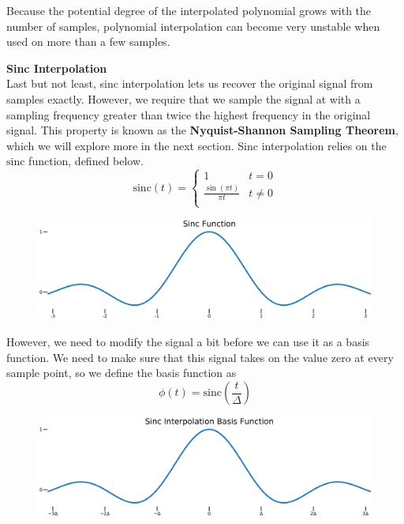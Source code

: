 Because the potential degree of the interpolated polynomial grows with the number of samples, polynomial interpolation can become very unstable when used on more than a few samples.

\textbf{Sinc Interpolation} \\
Last but not least, sinc interpolation lets us recover the original signal from samples exactly. However, we require that we sample the signal at with a sampling frequency greater than twice the highest frequency in the original signal. This property is known as the \textbf{Nyquist-Shannon Sampling Theorem}, which we will explore more in the next section.
\newline
Sinc interpolation relies on the $\mathrm{sinc}$ function, defined below.
\begin{equation*}
\mathrm{sinc}(t) = \begin{cases}
1 & t = 0 \\
\frac{\sin{} (\pi t)}{\pi t} & t \neq 0 \\
\end{cases}
\end{equation*}

\begin{figure}[H]
\centering
\includegraphics[width=.8\textwidth]{figures/sinc}
\end{figure}

However, we need to modify the signal a bit before we can use it as a basis function. We need to make sure that this signal takes on the value zero at every sample point, so we define the basis function as
\begin{equation*}
    \phi(t) = \mathrm{sinc}(\frac{t}{\Delta})
\end{equation*}

\begin{figure}[H]
\centering
\includegraphics[width=.8\textwidth]{figures/sinc_basis}
\end{figure}


